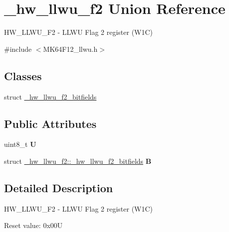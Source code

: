 \hypertarget{union__hw__llwu__f2}{}\section{\+\_\+hw\+\_\+llwu\+\_\+f2 Union Reference}
\label{union__hw__llwu__f2}


H\+W\+\_\+\+L\+L\+W\+U\+\_\+\+F2 -\/ L\+L\+WU Flag 2 register (W1C)  




{\ttfamily \#include $<$M\+K64\+F12\+\_\+llwu.\+h$>$}

\subsection*{Classes}
\begin{DoxyCompactItemize}
\item 
struct \hyperlink{struct__hw__llwu__f2_1_1__hw__llwu__f2__bitfields}{\+\_\+hw\+\_\+llwu\+\_\+f2\+\_\+bitfields}
\end{DoxyCompactItemize}
\subsection*{Public Attributes}
\begin{DoxyCompactItemize}
\item 
uint8\+\_\+t {\bfseries U}\hypertarget{union__hw__llwu__f2_ad318a908631a536ab39d6eeeb863f037}{}\label{union__hw__llwu__f2_ad318a908631a536ab39d6eeeb863f037}

\item 
struct \hyperlink{struct__hw__llwu__f2_1_1__hw__llwu__f2__bitfields}{\+\_\+hw\+\_\+llwu\+\_\+f2\+::\+\_\+hw\+\_\+llwu\+\_\+f2\+\_\+bitfields} {\bfseries B}\hypertarget{union__hw__llwu__f2_aa2c88ea662d7cf6aaa7fba63024b7818}{}\label{union__hw__llwu__f2_aa2c88ea662d7cf6aaa7fba63024b7818}

\end{DoxyCompactItemize}


\subsection{Detailed Description}
H\+W\+\_\+\+L\+L\+W\+U\+\_\+\+F2 -\/ L\+L\+WU Flag 2 register (W1C) 

Reset value\+: 0x00U

